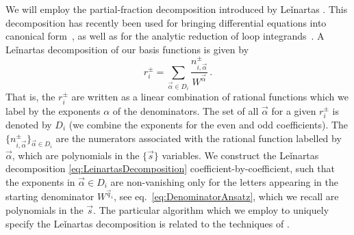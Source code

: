 We will employ the partial-fraction decomposition introduced by
Leǐnartas \cite{leinartas1978factorization,raichev2012leinartas}.
This decomposition has recently been used for bringing differential equations into
canonical form~\cite{Meyer:2016slj}, as well as for the
analytic reduction of loop integrands~\cite{Zhang:2012ce, Mastrolia:2012an}.
A Leǐnartas decomposition of our basis functions is given by
\begin{equation}
    r_i^{\pm} = \sum_{\vec\alpha \in D_i} \frac{n^{\pm}_{i,\vec\alpha}}{ 
	W^{\vec\alpha} }\,.
    \label{eq:LeinartasDecomposition}
\end{equation}
That is, the $r_i^{\pm}$ are written as a linear combination of rational
functions which we label by the exponents $\alpha$ of the denominators.
The set of all $\vec\alpha$ for a given $r_i^{\pm}$ is denoted by $D_i$ (we combine
the exponents for the even and odd coefficients). The 
$\{n_{i,\vec\alpha}^\pm \}_{\vec\alpha\in D_i}$ are the numerators associated
with the rational function labelled by $\vec\alpha$,
which are polynomials in the $\{\vec s\}$ variables.
We construct the Leǐnartas decomposition 
\eqref{eq:LeinartasDecomposition} coefficient-by-coefficient, such that the exponents in 
$\vec\alpha\in D_i$ are non-vanishing only for the letters appearing 
in the starting denominator $W^{\vec q_i}$, see eq.~\eqref{eq:DenominatorAnsatz}, 
which we recall are polynomials in the $\vec s$.
The particular algorithm which we employ to uniquely specify the 
Leǐnartas decomposition is related to the techniques 
of \cite{Smirnov:2005ky}.


